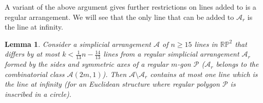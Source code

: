 \documentclass[a4paper,11pt,reqno]{amsart}
\newtheorem{lem}[thm]{Lemma}
\theoremstyle{definition}
\theoremstyle{remark}
\theoremstyle{definition}
\theoremstyle{definition}
\theoremstyle{definition}
\numberwithin{equation}{section}
\begin{document}
A variant of the above argument gives further restrictions on lines added to  is a regular arrangement. We will see that the only line that can be added to $\mathcal{A}_{r}$  is the line at infinity.

\begin{lem}\label{lem:rigidity1}
Consider a simplicial arrangement $\mathcal{A}$ of $n \geq 15$ lines in $\mathbb{RP}^{2}$ that differs by at most $k < \frac{1}{13}n - \frac{14}{13}$ lines from a regular simplicial arrangement $\mathcal{A}_{r}$ formed by the sides and symmetric axes of a regular $m$-gon $\mathcal{P}$ ($\mathcal{A}_{r}$ belongs to the combinatorial class $\mathcal{A}(2m,1)$). Then $\mathcal{A} \setminus \mathcal{A}_{r}$ contains at most one line which is the line at infinity (for an Euclidean structure where regular polygon $\mathcal{P}$ is inscribed in a circle).
\end{lem}
\end{document}
